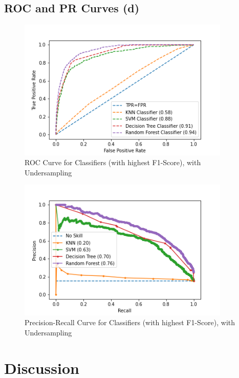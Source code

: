 \documentclass{article}
\begin{document}
\subsection{ROC and PR Curves (d)}

\begin{figure}[H]
\includegraphics[width=0.90\textwidth]{ROCCurve_under}
\caption{ROC Curve for Classifiers (with highest F1-Score), with Undersampling}
\label{fig:rocCurve_under}
\end{figure}

\begin{figure}[H]
\includegraphics[width=0.90\textwidth]{PRCurve_under}
\caption{Precision-Recall Curve for Classifiers (with highest F1-Score), with Undersampling}
\label{fig:prCurve_under}
\end{figure}

\newpage
\section{Discussion}
\end{document}
